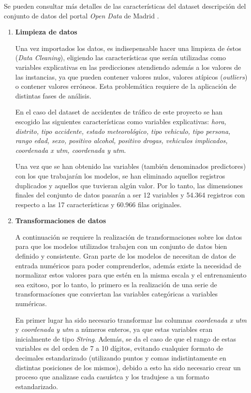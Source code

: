             Se pueden consultar más detalles de las características del dataset descripción del conjunto de datos del portal \textit{Open Data} de Madrid \cite{InfoDatasetMadrid}.


            \begin{enumerate}

                \item \textbf{Limpieza de datos}

                    Una vez importados los datos, es indisepensable hacer una limpieza de éstos (\textit{Data Cleaning}), eligiendo las características que serán utilizadas como variables explicativas en las predicciones atendiendo además a los valores de las instancias, ya que pueden contener valores nulos, valores atípicos (\textit{outliers}) o contener valores erróneos. Esta problemática requiere de la aplicación de distintas fases de análisis.

                    En el caso del dataset de accidentes de tráfico de este proyecto se han escogido las siguientes características como variables explicativas: \textit{hora, distrito, tipo accidente, estado meteorológico, tipo vehiculo, tipo persona, rango edad, sexo, positivo alcohol, positivo drogas, vehiculos implicados, coordenada x utm, coordenada y utm}.


                    Una vez que se han obtenido las variables (también denominados predictores) con los que trabajarán los modelos, se han eliminado aquellos registros duplicados y aquellos que tuvieran algún valor. Por lo tanto, las dimensiones finales del conjunto de datos pasarán a ser 12 variables y 54.364 registros con respecto a las 17 características y 60.966 filas originales. 

                \item \textbf{Transformaciones de datos}

                    A continuación se requiere la realización de transformaciones sobre los datos para que los modelos utilizados trabajen con un conjunto de datos bien definido y consistente. Gran parte de los modelos de  necesitan de datos de entrada numéricos para poder comprenderlos, además existe la necesidad de normalizar estos valores para que estén en la misma escala y el entrenamiento sea exitoso, por lo tanto, lo primero es la realización de una serie de transformacíones que conviertan las variables categóricas a variables numéricas.

                    En primer lugar ha sido necesario transformar las columnas \textit{coordenada x utm} y \textit{coordenada y utm} a números enteros, ya que estas variables eran inicialmente de tipo \textit{String}. Además, se da el caso de que el rango de estas variables es del orden de 7 a 10 dígitos, evitando cualquier formato de decimales estandarizado (utilizando puntos y comas indistintamente en distintas posiciones de los mismos), debido a esto ha sido necesario crear un proceso que analizase cada casuístca y los tradujese a un formato estandarizado.


\end{enumerate}

